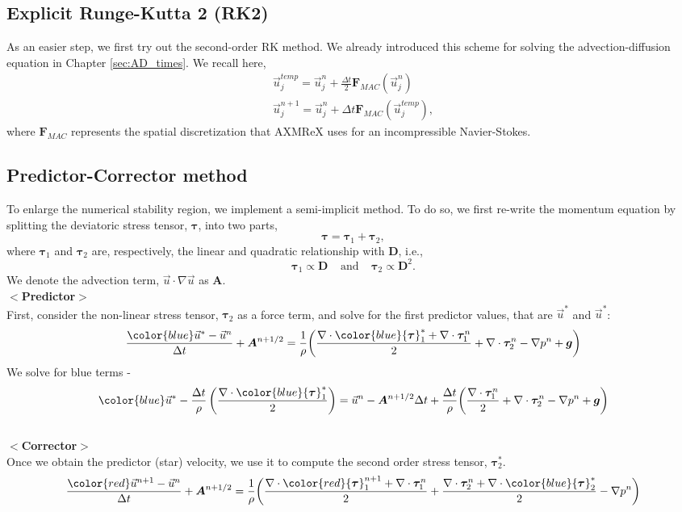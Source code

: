 \subsection{Explicit Runge-Kutta 2 (RK2)}
As an easier step, we first try out the second-order RK method. We already introduced this scheme for solving the advection-diffusion equation in Chapter \ref{sec:AD_times}. We recall here, 
\begin{align}
	\vec{u}_{j}^{temp} = \vec{u}_j^{n} + \frac{\Delta t}{2} {\bm F_{MAC}} \left( \vec{u}_j^{n} \right)
	\label{eq_RK2_s1} \\ 
	\vec{u}_j^{n+1} = \vec{u}_j^{n} + \Delta t {\bm F_{MAC}} \left( \vec{u}_j^{temp} \right),
	\label{eq_RK2_s2}
\end{align}
where ${\bm F_{MAC}}$ represents the spatial discretization that AXMReX uses for an incompressible Navier-Stokes. 


\subsection{Predictor-Corrector method}
To enlarge the numerical stability region, we implement a semi-implicit method. To do so, we first re-write the momentum equation by splitting the deviatoric stress tensor, ${\bm \tau}$, into two parts, 
\[
 {\bm \tau}= {\bm \tau_1} + {\bm \tau_2},
\] 
where ${\bm \tau_1}$ and ${\bm \tau_2}$ are, respectively, the linear and quadratic relationship with ${\bm D}$, i.e., 
\[
  {\boldsymbol \tau_1} \propto \boldsymbol{D}
  \ \ \ \ \ \text{and}
   \ \ \ \ \ 
{\boldsymbol \tau_2} \propto {\boldsymbol D^2}.
\]
We denote the advection term, $\vec{u} \cdot \nabla \vec{u}$ as ${\bm A}$. 
\\
$<${\bf Predictor}$>$
\\
First, consider the non-linear stress tensor, ${\bm \tau_2}$ as a force term, and solve for the first predictor values, that are $\vec{u}^*$ and $\vec{u}^*$:
\[
\frac{{\color{blue}\vec{u}^*} - \vec{u}^n}{\Delta t} 
+  {\bm A}^{n+1/2} 
= \frac{1}{\rho}  \biggl(
\frac{\nabla \cdot {\color{blue}{\bm \tau}_1^*} + \nabla \cdot{\bm \tau}_1^n}{2} 
+ \nabla \cdot {\bm \tau}_2^n 
- \nabla p^n
+{\bm g}
\biggr)
\]
We solve for blue terms - 
\[
{\color{blue}\vec{u}^*} -
\frac{\Delta t}{\rho} 
\left( 
\frac{\nabla \cdot {\color{blue}{\bm \tau}_1^*}}{2}
\right)
=
\vec{u}^n
- {\bm A}^{n+1/2} \Delta t
+ \frac{\Delta t}{\rho} \biggl(
\frac{ \nabla \cdot{\bm \tau}_1^n}{2} 
+ \nabla \cdot {\bm \tau}_2^n 
- \nabla p^n
+{\bm g}
\biggr)
\]
\\
$<${\bf Corrector}$>$
\\
Once we obtain the predictor (star) velocity, we use it to compute the second order stress tensor, ${\bm \tau}_2^*$.
\[
\frac{{\color{red}\vec{u}^{n+1}} - \vec{u}^n}{\Delta t} 
+  {\bm A}^{n+1/2} 
=  \frac{1}{\rho}  \biggl(
\frac{\nabla \cdot {\color{red}{\bm \tau}_1^{n+1}} + \nabla \cdot{\bm \tau}_1^n}{2} 
+ \frac{\nabla \cdot {\bm \tau}_2^{n} + \nabla \cdot {\color{blue}{\bm \tau}_2^*}}{2} 
- \nabla p^n
\biggr)
\]

